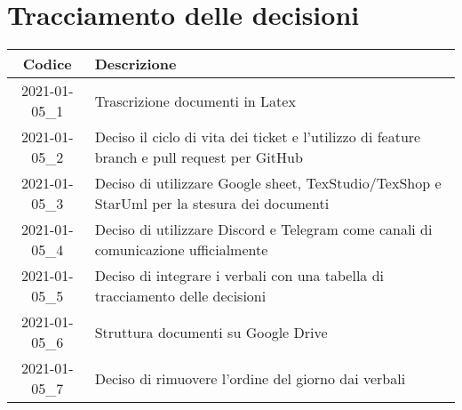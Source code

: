 \section*{Tracciamento delle decisioni}

\begin{center}
	\begin{longtable}{|c|p{12.25cm}|}
	\hline
	\rowcolor{lighter-grayer}
	\textbf{Codice} & \textbf{Descrizione} \\
	\hline
	\endfirsthead

	\hline
	2021-01-05\_1 & Trascrizione documenti in Latex\\
	\hline
	2021-01-05\_2 & Deciso il ciclo di vita dei ticket e l’utilizzo di feature branch e pull request per GitHub\\
	\hline
	2021-01-05\_3 & Deciso di utilizzare Google sheet, TexStudio/TexShop e StarUml per la stesura dei documenti\\
	\hline
	2021-01-05\_4 & Deciso di utilizzare Discord e Telegram come canali di comunicazione ufficialmente\\
	\hline
	2021-01-05\_5 & Deciso di integrare i verbali con una tabella di tracciamento delle decisioni\\
	\hline
	2021-01-05\_6 & Struttura documenti su Google Drive\\
	\hline
	2021-01-05\_7 & Deciso di rimuovere l’ordine del giorno dai verbali\\
	\hline
	\end{longtable}
\end{center}
